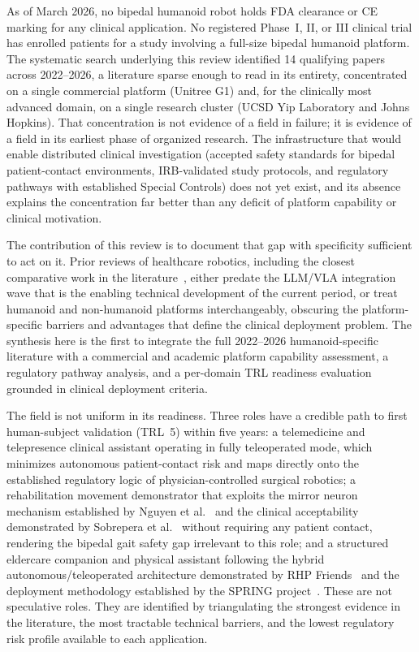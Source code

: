 \documentclass[acmjour]{acmart}
\begin{document}
As of March 2026, no bipedal humanoid robot holds FDA clearance or CE marking for
any clinical application. No registered Phase~I, II, or III clinical trial has
enrolled patients for a study involving a full-size bipedal humanoid platform. The
systematic search underlying this review identified 14 qualifying papers across
2022--2026, a literature sparse enough to read in its entirety, concentrated on a
single commercial platform (Unitree G1) and, for the clinically most advanced
domain, on a single research cluster (UCSD Yip Laboratory and Johns Hopkins). That
concentration is not evidence of a field in failure; it is evidence of a field in
its earliest phase of organized research. The infrastructure that would enable
distributed clinical investigation (accepted safety standards for bipedal
patient-contact environments, IRB-validated study protocols, and regulatory
pathways with established Special Controls) does not yet exist, and its absence
explains the concentration far better than any deficit of platform capability or
clinical motivation.

The contribution of this review is to document that gap with specificity
sufficient to act on it. Prior reviews of healthcare robotics, including the
closest comparative work in the literature~\cite{cunha2025humanoid}, either
predate the LLM/VLA integration wave that is the enabling technical development of the
current period, or treat humanoid and non-humanoid platforms interchangeably,
obscuring the platform-specific barriers and advantages that define the clinical
deployment problem. The synthesis here is the first to integrate the full
2022--2026 humanoid-specific literature with a commercial and academic platform
capability assessment, a regulatory pathway analysis, and a per-domain TRL
readiness evaluation grounded in clinical deployment criteria.

The field is not uniform in its readiness. Three roles have a credible path to
first human-subject validation (TRL~5) within five years: a telemedicine and
telepresence clinical assistant operating in fully teleoperated mode, which
minimizes autonomous patient-contact risk and maps directly onto the established
regulatory logic of physician-controlled surgical robotics; a rehabilitation
movement demonstrator that exploits the mirror neuron mechanism established by
Nguyen et al.~\cite{nguyen2024eeg} and the clinical acceptability demonstrated by
Sobrepera et al.~\cite{sobrepera2022feasibility} without requiring any patient
contact, rendering the bipedal gait safety gap irrelevant to this role; and a
structured eldercare companion and physical assistant following the hybrid
autonomous/teleoperated architecture demonstrated by RHP
Friends~\cite{benallegue2025rhp} and the deployment methodology established by
the SPRING project~\cite{alamedapineda2024spring}. These are not speculative
roles. They are identified by triangulating the strongest evidence in the
literature, the most tractable technical barriers, and the lowest regulatory risk
profile available to each application.
\end{document}
